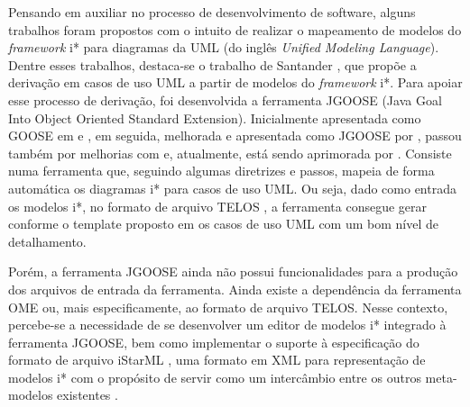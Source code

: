             Pensando em auxiliar no processo de desenvolvimento de software,
            alguns trabalhos foram propostos com o intuito de realizar o mapeamento
            de modelos do \emph{framework} i*
            para diagramas da UML (do inglês \emph{Unified   Modeling   Language}).
            Dentre esses trabalhos, destaca-se o trabalho de Santander \cite{santander2002integrando},
            que propõe a derivação em casos de uso UML a partir de modelos do \emph{framework} i*.
                Para apoiar esse processo de derivação,
                foi desenvolvida a ferramenta JGOOSE (Java Goal Into Object Oriented Standard Extension).
                Inicialmente apresentada como GOOSE em
                    \cite{pedroza2004ferramentas}
                    e
                    \cite{brischke2005desenvolvimento},
                em seguida, melhorada e apresentada como JGOOSE por
                    \cite{vicente2009},
                passou também por melhorias com
                    \cite{brischke2012melhorando}
                e, atualmente,
                está sendo aprimorada por
                    \cite{peliser2013aprimorando}.
                Consiste numa ferramenta que, seguindo algumas diretrizes e passos, mapeia de forma automática os diagramas i* para casos de uso UML.
                Ou seja, dado como entrada os modelos i*, no formato de arquivo TELOS
                    \cite{mylopoulos1990telos}
                    \cite{koubarakis1989telos},
                a ferramenta consegue gerar conforme o template proposto em
                    \cite{cockburn2001writing}
                os casos de uso UML com um bom nível de detalhamento.

                Porém, a ferramenta JGOOSE ainda não possui funcionalidades para a produção dos arquivos de entrada da ferramenta.
                Ainda existe a dependência da ferramenta OME ou, mais especificamente, ao formato de arquivo TELOS.
                Nesse contexto, percebe-se a necessidade de se desenvolver um editor de modelos i* integrado à ferramenta JGOOSE,
                bem como implementar o suporte à especificação do formato de arquivo iStarML
                    \cite{cares2007istarml},
                uma formato em XML
                para representação de modelos i*
                com o propósito de servir como um intercâmbio entre os outros meta-modelos existentes
                    \cite{colomer2011model}.
